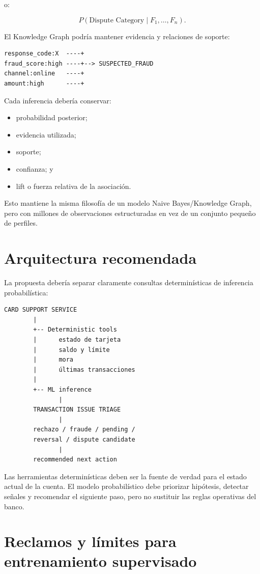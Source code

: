 \documentclass[11pt,a4paper]{article}
\begin{document}
o:

\[
P(\text{Dispute Category}\mid F_1,\ldots,F_n).
\]

El Knowledge Graph podría mantener evidencia y relaciones de soporte:

\begin{lstlisting}
response_code:X  ----+
fraud_score:high ----+--> SUSPECTED_FRAUD
channel:online   ----+
amount:high      ----+
\end{lstlisting}

Cada inferencia debería conservar:

\begin{itemize}
  \item probabilidad posterior;
  \item evidencia utilizada;
  \item soporte;
  \item confianza; y
  \item lift o fuerza relativa de la asociación.
\end{itemize}

Esto mantiene la misma filosofía de un modelo Naive Bayes/Knowledge Graph, pero con millones de observaciones estructuradas en vez de un conjunto pequeño de perfiles.

\section{Arquitectura recomendada}

La propuesta debería separar claramente consultas determinísticas de inferencia probabilística:

\begin{lstlisting}
CARD SUPPORT SERVICE
        |
        +-- Deterministic tools
        |      estado de tarjeta
        |      saldo y límite
        |      mora
        |      últimas transacciones
        |
        +-- ML inference
               |
        TRANSACTION ISSUE TRIAGE
               |
        rechazo / fraude / pending /
        reversal / dispute candidate
               |
        recommended next action
\end{lstlisting}

Las herramientas determinísticas deben ser la fuente de verdad para el estado actual de la cuenta. El modelo probabilístico debe priorizar hipótesis, detectar señales y recomendar el siguiente paso, pero no sustituir las reglas operativas del banco.

\section{Reclamos y límites para entrenamiento supervisado}
\end{document}
